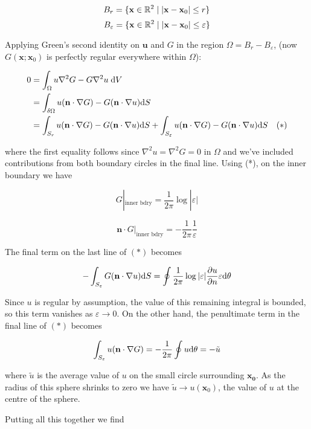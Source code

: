 \documentclass[a4paper]{article}
\begin{document}
\[ B_{r} = \{ \mathbf{x} \in \mathbb{R}^{2} \; | \; | \mathbf{x} - \mathbf{x}_{0} | \leq r \} \]
\[ B_{\varepsilon} = \{ \mathbf{x} \in \mathbb{R}^{2} \; | \; | \mathbf{x} - \mathbf{x}_{0} | \leq \varepsilon \} \]

Applying Green's second identity on $ \mathbf{u} $ and $ G $ in the region $ \Omega = B_{r} - B_{\varepsilon} $, (now  $ G(\mathbf{x};\mathbf{x}_{0}) $ is perfectly regular everywhere within $ \Omega $):

\begin{align*}
0 & = \int_{\Omega}  u \nabla^{2} G  - G \nabla^{2} u \; \mathrm{d} V \\
& = \int_{\delta \Omega} u ( \mathbf{n} \cdot \nabla G ) - G ( \mathbf{n} \cdot \nabla u ) \mathrm{d} S  \\
& = \int_{S_{r}} u ( \mathbf{n} \cdot \nabla G ) - G ( \mathbf{n} \cdot \nabla u ) \mathrm{d} S + \int_{S_{\varepsilon}} u ( \mathbf{n} \cdot \nabla G ) - G ( \mathbf{n} \cdot \nabla u ) \mathrm{d} S \quad(*)
\end{align*}

where the first equality follows since $ \nabla^{2} u = \nabla^{2} G = 0 $ in $ \Omega $ and we've included contributions from both boundary circles in the final line. Using (*), on the inner boundary we have

\[ G|_{\text{inner bdry}} = \frac{1}{2\pi} \log | \varepsilon | \]

\[ \mathbf{n} \cdot G|_{\text{inner bdry}} = - \frac{1}{2\pi} \frac{1}{\varepsilon}  \]


The final term on the last line of $ (*) $ becomes

\[ - \int_{S_{\varepsilon}} G ( \mathbf{n} \cdot \nabla u ) \mathrm{d} S =  \oint \frac{1}{2\pi} \log | \varepsilon | \frac{\partial u }{\partial n} \varepsilon \mathrm{d} \theta  \]

Since $ u $ is regular by assumption, the value of this remaining integral is bounded, so this term vanishes as $ \varepsilon \to 0 $. On the other hand, the penultimate term in the final line of $ (*) $ becomes

\[ \int_{S_{\varepsilon}} u ( \mathbf{n} \cdot \nabla G ) = - \frac{1}{2\pi }\oint u \mathrm{d} \theta = - \tilde{u}  \]

where $ \tilde{u} $ is the average value of $ u $ on the small circle surrounding  $ \mathbf{x_{0}} $. As the radius of this sphere shrinks to zero we have $ \tilde{u} \to u(\mathbf{x}_{0}) $, the value of $ u $ at the centre of the sphere. 

Putting all this together we find
\end{document}

